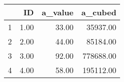 \begin{table}[ht]
\centering
\begin{tabular}{rrrr}
  \hline
 & ID & a\_value & a\_cubed \\ 
  \hline
1 & 1.00 & 33.00 & 35937.00 \\ 
  2 & 2.00 & 44.00 & 85184.00 \\ 
  3 & 3.00 & 92.00 & 778688.00 \\ 
  4 & 4.00 & 58.00 & 195112.00 \\ 
   \hline
\end{tabular}
\end{table}
